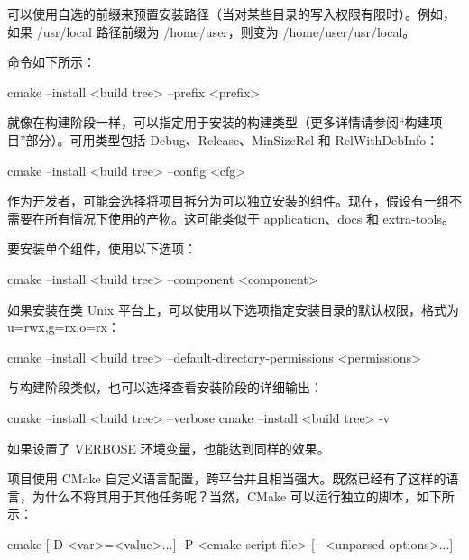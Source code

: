 可以使用自选的前缀来预置安装路径（当对某些目录的写入权限有限时）。例如，如果 /usr/local 路径前缀为 /home/user，则变为 /home/user/usr/local。

命令如下所示：

\begin{shell}
cmake --install <build tree> --prefix <prefix>
\end{shell}


就像在构建阶段一样，可以指定用于安装的构建类型（更多详情请参阅“构建项目”部分）。可用类型包括 Debug、Release、MinSizeRel 和 RelWithDebInfo：

\begin{shell}
cmake --install <build tree> --config <cfg>
\end{shell}


作为开发者，可能会选择将项目拆分为可以独立安装的组件。现在，假设有一组不需要在所有情况下使用的产物。这可能类似于 application、docs 和 extra-tools。

要安装单个组件，使用以下选项：

\begin{shell}
cmake --install <build tree> --component <component>
\end{shell}


如果安装在类 Unix 平台上，可以使用以下选项指定安装目录的默认权限，格式为 u=rwx,g=rx,o=rx：

\begin{shell}
cmake --install <build tree>
      --default-directory-permissions <permissions>
\end{shell}


与构建阶段类似，也可以选择查看安装阶段的详细输出：

\begin{shell}
cmake --install <build tree> --verbose
cmake --install <build tree> -v
\end{shell}

如果设置了 VERBOSE 环境变量，也能达到同样的效果。


项目使用 CMake 自定义语言配置，跨平台并且相当强大。既然已经有了这样的语言，为什么不将其用于其他任务呢？当然，CMake 可以运行独立的脚本，如下所示：

\begin{shell}
cmake [{-D <var>=<value>}...] -P <cmake script file>
      [-- <unparsed options>...]
\end{shell}

